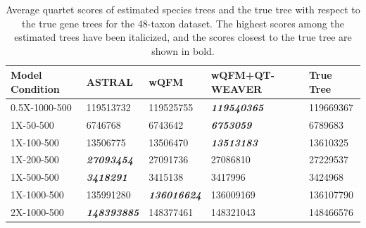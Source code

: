 \documentclass[10pt,a4paper]{article}
\begin{document}
\begin{table}[h!]
    \centering
    \caption{Average quartet scores of estimated species trees and the true tree with respect to the true gene trees for the 48-taxon dataset. The highest scores among the estimated trees have been italicized, and the scores closest to the true tree are shown in bold.}
    \label{tab:48-quartet-scores-true}
    \begin{tabular}{|C{2.3cm}|C{3cm}|C{3cm}|C{3cm}|C{3cm}|}
        \hline
        \textbf{Model Condition} & \textbf{ASTRAL} & \textbf{wQFM} & \textbf{wQFM+QT-WEAVER} & \textbf{True  Tree} \\
        \hline \hline
        0.5X-1000-500 & 119513732 & 119525755 & \textbf{\textit{119540365}} & 119669367 \\
        \hline
        1X-50-500 & 6746768 & 6743642 & \textbf{\textit{6753059}} & 6789683 \\
        \hline
        1X-100-500 & 13506775 & 13506470 & \textbf{\textit{13513183}} & 13610325 \\
        \hline
        1X-200-500 & \textbf{\textit{27093454}} & 27091736 & 27086810 & 27229537 \\
        \hline
        1X-500-500 & \textbf{\textit{3418291}} & 3415138 & 3417996 & 3424968 \\
        \hline
        1X-1000-500 & 135991280 & \textbf{\textit{136016624}} & 136009169 & 136107790 \\
        \hline
        2X-1000-500 & \textbf{\textit{148393885}} & 148377461 & 148321043 & 148466576 \\
        \hline
    \end{tabular}
\end{table}

\clearpage

\end{document}
